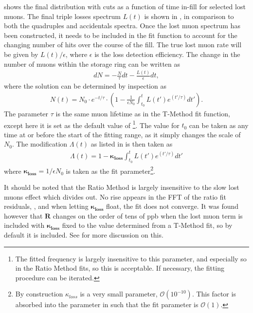  shows the final \DT distribution with cuts as a function of time in-fill for selected lost muons. The final triple losses spectrum $L(t)$ is shown in , in comparison to both the quadruples and accidentals spectra. Once the lost muon spectrum has been constructed, it needs to be included in the fit function to account for the changing number of hits over the course of the fill. The true lost muon rate will be given by $L(t)/\epsilon$, where $\epsilon$ is the loss detection efficiency. The change in the number of muons within the storage ring can be written as 
    \begin{align} 
        dN = -\frac{N}{\tau} dt - \frac{L(t)}{\epsilon} dt, 
    \end{align}
where the solution can be determined by inspection as
    \begin{align} 
        N(t) = N_{0} \cdot e^{-t/\tau} \cdot (1 - \frac{1}{\epsilon N_{0}} \int_{t_{0}}^{t} L(t')e^{(t'/\tau)} dt').
    \end{align}
The parameter $\tau$ is the same muon lifetime as in the T-Method fit function, except here it is set as the default value of \footnote{The fitted \wa frequency is largely insensitive to this parameter, and especially so in the Ratio Method fits, so this is acceptable. If necessary, the fitting procedure can be iterated.}. The value for $t_{0}$ can be taken as any time at or before the start of the fitting range, as it simply changes the scale of $N_{0}$. The modification $\Lambda(t)$ as listed in  is then taken as
    \begin{align} \label{eq:lambdalosses}
        \Lambda(t) = 1 - \boldsymbol{\kappa_{loss}} \int_{t_{0}}^{t} L(t')e^{(t'/\tau)} dt'
    \end{align}
where $\boldsymbol{\kappa_{loss}} = 1/\epsilon N_{0}$ is taken as the fit parameter\footnote{By construction $\kappa_{loss}$ is a very small parameter, $\mathcal{O}(10^{-10})$. This factor is absorbed into the parameter in such that the fit parameter is $\mathcal{O}(1)$.}.

It should be noted that the Ratio Method is largely insensitive to the slow lost muons effect which divides out. No rise appears in the FFT of the ratio fit residuals, , and when letting $\boldsymbol{\kappa_{loss}}$ float, the fit does not converge. It was found however that $\boldsymbol{R}$ changes on the order of tens of ppb when the lost muon term is included with $\boldsymbol{\kappa_{loss}}$ fixed to the value determined from a T-Method fit, so by default it is included. See  for more discussion on this.


